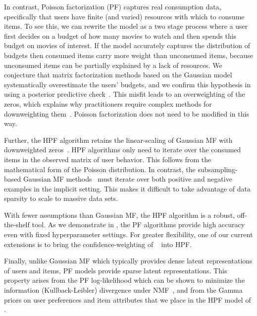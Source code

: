 In contrast, Poisson factorization (PF) captures real consumption
data, specifically that users have finite (and varied) resources with
which to consume items.  To see this, we can rewrite the model as a
two stage process where a user first decides on a budget of how many
movies to watch and then spends this budget on movies of interest. If
the model accurately captures the distribution of budgets then
consumed items carry more weight than unconsumed items, because
unconsumed items can be partially explained by a lack of resources. We
conjecture that matrix factorization methods based on the Gaussian
model systematically overestimate the users' budgets, and we confirm
this hypothesis in  using a posterior predictive
check~\cite{Gelman:1996}. This misfit leads to an overweighting of the
zeros, which explains why practitioners require complex methods for
downweighting
them~\cite{Hu:2008p9402,Gantner:2012p9364,Dror:2012a,Paquet:2013p9197}.
Poisson factorization does not need to be modified in this way.

Further, the HPF algorithm retains the linear-scaling of Gaussian MF
with downweighted zeros~\cite{Hu:2008p9402}. HPF algorithms only need
to iterate over the consumed items in the observed matrix of user
behavior. This follows from the mathematical form of the Poisson
distribution.  In contrast, the subsampling-based Gaussian MF
methods~\cite{Gantner:2012p9364, Dror:2012a,Paquet:2013p9197} must
iterate over both positive and negative examples in the implicit
setting. This makes it difficult to take advantage of data sparsity to
scale to massive data sets.

With fewer assumptions than Gaussian MF, the HPF algorithm is a
robust, off-the-shelf tool. As we demonstrate in , the PF
algorithms provide high accuracy even with fixed hyperparameter
settings. For greater flexibility, one of our current extensions is to
bring the confidence-weighting of ~\cite{Hu:2008p9402} into HPF.

Finally, unlike Gaussian MF which typically provides dense latent
representations of users and items, PF models provide sparse latent
representations. This property arises from the PF log-likelihood which
can be shown to minimize the information (Kullback-Leibler) divergence
under NMF~\cite{Cemgil:2009}, and from the Gamma priors on user
preferences and item attributes that we place in the HPF model of
.

